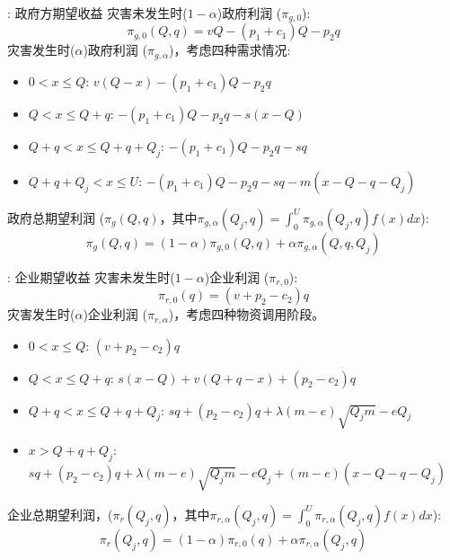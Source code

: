 \documentclass[9pt]{beamer}
\begin{document}
\begin{frame}{\insertsectionhead: 政府方期望收益}
    灾害未发生时($1-\alpha$)政府利润 ($\pi_{g,0}$):
    \begin{equation} \label{eq:beamer_profit_no_disaster_gov}
    \pi_{g,0}(Q,q) = v Q - (p_1 + c_1) Q - p_2 q
    \end{equation}
    灾害发生时($\alpha$)政府利润 ($\pi_{g,\alpha}$)，考虑四种需求情况:
    \begin{itemize}
        \item $0 < x \leq Q$: $v(Q-x) - (p_1+c_1)Q - p_2q$
        \item $Q < x \leq Q+q$: $-(p_1+c_1)Q - p_2q - s(x-Q)$
        \item $Q+q < x \leq Q+q+Q_j$: $-(p_1+c_1)Q - p_2q - sq$
        \item $Q+q+Q_j < x \leq U$: $-(p_1+c_1)Q - p_2q - sq - m(x-Q-q-Q_j)$
    \end{itemize}
    政府总期望利润 ($\pi_g(Q,q)$，其中${\pi}_{g,\alpha}(Q_j,q) = \int_0^U \pi_{g,\alpha}(Q_j,q) f(x) dx$):
    \begin{equation} \label{eq:beamer_expected_profit_gov}
    \pi_g(Q,q) = (1-\alpha) \pi_{g,0}(Q,q) + \alpha \pi_{g,\alpha}(Q,q, Q_j)
    \end{equation}
    
\end{frame}

\begin{frame}{\insertsectionhead: 企业期望收益}
    灾害未发生时($1-\alpha$)企业利润 ($\pi_{r,0}$):
    \begin{equation} \label{eq:beamer_enterprise_profit_no_disaster}
    {\pi}_{r,0}(q) = (v + p_2 - c_2)q
    \end{equation}
    灾害发生时($\alpha$)企业利润 ($\pi_{r,\alpha}$)，考虑四种物资调用阶段。
    \begin{itemize}
        \item $0 < x \leq Q$: $(v + p_2 - c_2)q$
        \item $Q < x \leq Q+q$: $s(x-Q) + v(Q + q - x) + (p_2 - c_2)q$
        \item $Q+q < x \leq Q+q+Q_j$: $sq + (p_2 - c_2)q + \lambda(m-e)\sqrt{Q_jm} - eQ_j$
        \item $x > Q+q+Q_j$: $sq + (p_2 - c_2)q + \lambda(m-e)\sqrt{Q_jm} - eQ_j + (m-e)(x-Q-q-Q_j)$
    \end{itemize}
    企业总期望利润，(${\pi}_r(Q_j,q)$，其中${\pi}_{r,\alpha}(Q_j,q) = \int_0^U \pi_{r,\alpha}(Q_j,q) f(x) dx$):
    \begin{equation} \label{eq:beamer_enterprise_expected_profit}
    {\pi}_r(Q_j,q) = (1-\alpha){\pi}_{r,0}(q) + \alpha{\pi}_{r,\alpha}(Q_j,q)
    \end{equation}
   
\end{frame}
\end{document}
